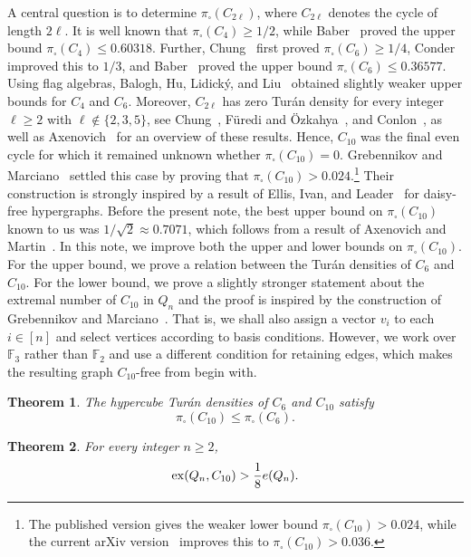 \documentclass[11pt]{article}
\newcounter{case}[section]
\theoremstyle{plain}
\newtheorem{theorem}{Theorem}[section]
\theoremstyle{definition}
\newcommand{\ex}{{\rm ex}}
\begin{document}
A central question is to determine $\pi_\square(C_{2\ell})$, where $C_{2\ell}$ denotes the cycle of length $2\ell$.
It is well known that $\pi_\square(C_{4}) \geq 1/2$, while Baber~\cite{baber} proved the upper bound $\pi_\square(C_{4}) \leq 0.60318$. 
Further, Chung~\cite{chung} first proved $\pi_{\square}(C_6) \geq 1/4$, Conder~\cite{conder} improved this to $1/3$, and Baber~\cite{baber} proved the upper bound $\pi_{\square}(C_6) \leq 0.36577$. 
Using flag algebras, Balogh, Hu, Lidick\'y, and Liu~\cite{BHLL} obtained slightly weaker upper bounds for $C_4$ and $C_6$.
Moreover, $C_{2\ell}$ has zero Tur\'an density for every integer
$\ell \geq 2$ with $\ell \notin \{2,3,5\}$, see
Chung~\cite{chung}, F\"uredi and \"Ozkahya~\cite{FOe1,FOe2}, and
Conlon~\cite{conlon}, as well as Axenovich~\cite{axenovich} for an
overview of these results.
Hence, $C_{10}$ was the final even cycle for which it remained unknown whether $\pi_{\square}(C_{10})=0$.
Grebennikov and Marciano~\cite{GM1} settled this case by proving that
$\pi_{\square}(C_{10}) > 0.024$.\footnote{The published version gives the weaker lower bound $\pi_{\square}(C_{10}) > 0.024$, while the current arXiv version~\cite{GM2} improves this to $\pi_{\square}(C_{10}) > 0.036$.} 
Their construction is strongly inspired by a result of Ellis, Ivan, and Leader~\cite{EIL} for daisy-free hypergraphs.
Before the present note, the best upper bound on $\pi_{\square}(C_{10})$ known to us was $1/\sqrt{2} \approx 0.7071$, which follows from a result of Axenovich and Martin~\cite[Theorem~3.3]{AM}. 
In this note, we improve both the upper and lower bounds on $\pi_{\square}(C_{10})$. 
For the upper bound, we prove a relation between the Tur\'an densities of $C_6$ and $C_{10}$. 
For the lower bound, we prove a slightly stronger statement about the extremal number of $C_{10}$ in $Q_n$ and the proof is inspired by the construction of Grebennikov and Marciano~\cite{GM2}. 
That is, we shall also assign a vector $v_i$ to each $i \in [n]$ and select vertices according to basis conditions. 
However, we work over $\mathbb{F}_3$ rather than $\mathbb{F}_2$ and use a different condition for retaining edges, which makes the resulting graph $C_{10}$-free from begin with.

\begin{theorem}\label{main}
The hypercube Tur\'an densities of $C_6$ and $C_{10}$ satisfy
\[
    \pi_{\square}(C_{10}) \leq \pi_{\square}(C_6).
\]
\end{theorem}

\begin{theorem}\label{main2}
For every integer $n \geq 2$,
\[
    \ex(Q_n,C_{10}) > \frac{1}{8} e(Q_n).
\]
\end{theorem}
\end{document}
